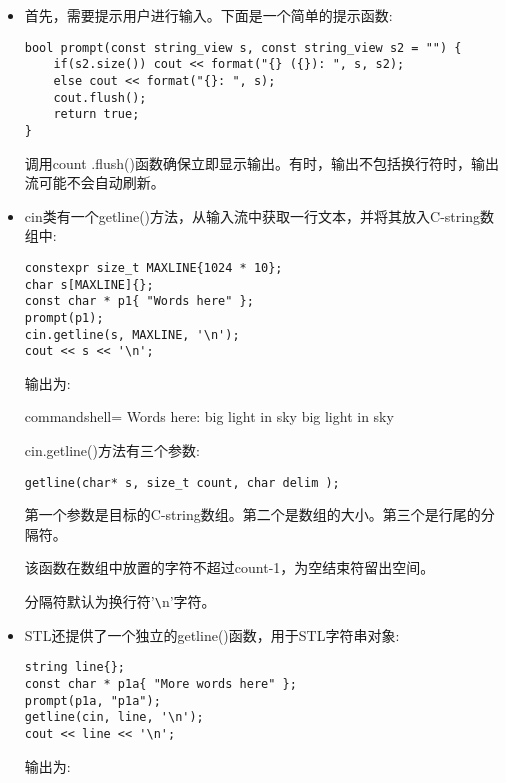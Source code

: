 \begin{itemize}
\item 
首先，需要提示用户进行输入。下面是一个简单的提示函数:

\begin{lstlisting}[style=styleCXX]
bool prompt(const string_view s, const string_view s2 = "") {
	if(s2.size()) cout << format("{} ({}): ", s, s2);
	else cout << format("{}: ", s);
	cout.flush();
	return true;
}
\end{lstlisting}

调用count .flush()函数确保立即显示输出。有时，输出不包括换行符时，输出流可能不会自动刷新。

\item 
cin类有一个getline()方法，从输入流中获取一行文本，并将其放入C-string数组中:

\begin{lstlisting}[style=styleCXX]
constexpr size_t MAXLINE{1024 * 10};
char s[MAXLINE]{};
const char * p1{ "Words here" };
prompt(p1);
cin.getline(s, MAXLINE, '\n');
cout << s << '\n';
\end{lstlisting}

输出为:

\begin{tcblisting}{commandshell={}}
Words here: big light in sky
big light in sky
\end{tcblisting}

cin.getline()方法有三个参数:

\begin{lstlisting}[style=styleCXX]
getline(char* s, size_t count, char delim );
\end{lstlisting}

第一个参数是目标的C-string数组。第二个是数组的大小。第三个是行尾的分隔符。

该函数在数组中放置的字符不超过count-1，为空结束符留出空间。

分隔符默认为换行符'\verb|\|n'字符。

\item 
STL还提供了一个独立的getline()函数，用于STL字符串对象:

\begin{lstlisting}[style=styleCXX]
string line{};
const char * p1a{ "More words here" };
prompt(p1a, "p1a");
getline(cin, line, '\n');
cout << line << '\n';
\end{lstlisting}

输出为:



\end{itemize}
